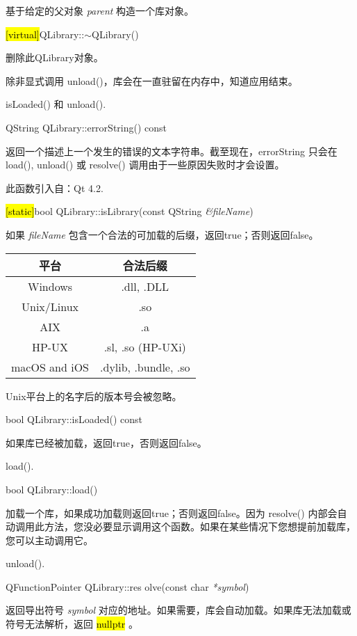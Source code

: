 基于给定的父对象 \emph{parent} 构造一个库对象。

\hl{[virtual]}QLibrary::$\sim$QLibrary()

删除此QLibrary对象。

除非显式调用 unload()，库会在一直驻留在内存中，知道应用结束。

\begin{notice}[另请参阅]
isLoaded() 和 unload().
\end{notice}


QString QLibrary::errorString() const

返回一个描述上一个发生的错误的文本字符串。截至现在，errorString 只会在 load(), unload() 或 resolve() 调用由于一些原因失败时才会设置。

此函数引入自：Qt 4.2.


\hl{[static]}bool QLibrary::isLibrary(const QString \emph{\&fileName})

如果 \emph{fileName} 包含一个合法的可加载的后缀，返回true；否则返回false。

\begin{tabular}{|c|c|}
\hline
平台& 	合法后缀\\
\hline
Windows& 	.dll, .DLL\\
\hline
Unix/Linux& 	.so\\
\hline
AIX 	&.a\\
\hline
HP-UX 	&.sl, .so (HP-UXi)\\
\hline
macOS and iOS& 	.dylib, .bundle, .so\\
\hline
\end{tabular}

Unix平台上的名字后的版本号会被忽略。

bool QLibrary::isLoaded() const

如果库已经被加载，返回true，否则返回false。

\begin{notice}[另请参阅]
load().
\end{notice}

bool QLibrary::load()

加载一个库，如果成功加载则返回true；否则返回false。因为 resolve() 内部会自动调用此方法，您没必要显示调用这个函数。如果在某些情况下您想提前加载库，您可以主动调用它。

\begin{notice}[另请参阅]
unload().
\end{notice}

QFunctionPointer QLibrary::res
olve(const char \emph{*symbol})

返回导出符号 \emph{symbol} 对应的地址。如果需要，库会自动加载。如果库无法加载或符号无法解析，返回 \hl{nullptr} 。

